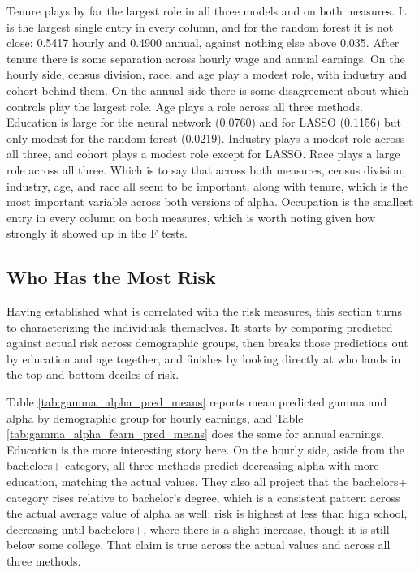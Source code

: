 \documentclass[12pt]{article}
\begin{document}
\begin{onehalfspace}
Tenure plays by far the largest role in all three models and on both measures. It is the largest single entry in every column, and for the random forest it is not close: 0.5417 hourly and 0.4900 annual, against nothing else above 0.035. After tenure there is some separation across hourly wage and annual earnings. On the hourly side, census division, race, and age play a modest role, with industry and cohort behind them. On the annual side there is some disagreement about which controls play the largest role. Age plays a role across all three methods. Education is large for the neural network (0.0760) and for LASSO (0.1156) but only modest for the random forest (0.0219). Industry plays a modest role across all three, and cohort plays a modest role except for LASSO. Race plays a large role across all three. Which is to say that across both measures, census division, industry, age, and race all seem to be important, along with tenure, which is the most important variable across both versions of alpha. Occupation is the smallest entry in every column on both measures, which is worth noting given how strongly it showed up in the F tests.


\subsection{Who Has the Most Risk}

Having established what is correlated with the risk measures, this section turns to characterizing the individuals themselves. It starts by comparing predicted against actual risk across demographic groups, then breaks those predictions out by education and age together, and finishes by looking directly at who lands in the top and bottom deciles of risk.

Table \ref{tab:gamma_alpha_pred_means} reports mean predicted gamma and alpha by demographic group for hourly earnings, and Table \ref{tab:gamma_alpha_fearn_pred_means} does the same for annual earnings. Education is the more interesting story here. On the hourly side, aside from the bachelors+ category, all three methods predict decreasing alpha with more education, matching the actual values. They also all project that the bachelors+ category rises relative to bachelor's degree, which is a consistent pattern across the actual average value of alpha as well: risk is highest at less than high school, decreasing until bachelors+, where there is a slight increase, though it is still below some college. That claim is true across the actual values and across all three methods.


\end{onehalfspace}
\end{document}
